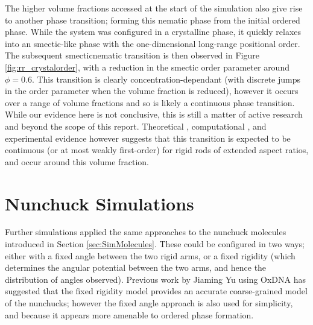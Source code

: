\documentclass[11pt, a4paper]{article} %
\begin{document}
The higher volume fractions accessed at the start of the simulation also give rise to another phase transition; forming this nematic phase from the initial ordered phase. While the system was configured in a crystalline phase, it quickly relaxes into an smectic-like phase with the one-dimensional long-range positional order. The subsequent smectic\textendash nematic transition is then observed in Figure \ref{fig:rr_crystalorder}, with a reduction in the smectic order parameter around $\phi  = 0.6$. This transition is clearly concentration-dependant (with discrete jumps in the order parameter when the volume fraction is reduced), however it occurs over a range of volume fractions and so is likely a continuous phase transition. While our evidence here is not conclusive, this is still a matter of active research and beyond the scope of this report. Theoretical \cite{Wen1987}, computational \cite{Frenkel1988, McGrother1996}, and experimental \cite{Dogic1997, Doane1972} evidence however suggests that this transition is expected to be continuous (or at most weakly first-order) for rigid rods of extended aspect ratios, and occur around this volume fraction. 

\section{Nunchuck Simulations} \label{sec:Nunchuck_Sim}
Further simulations applied the same approaches to the nunchuck molecules introduced in Section \ref{sec:SimMolecules}. These could be configured in two ways; either with a fixed angle between the two rigid arms, or a fixed rigidity (which determines the angular potential between the two arms, and hence the distribution of angles observed). Previous work by Jiaming Yu using OxDNA \cite{OxDNA} has suggested that the fixed rigidity model provides an accurate coarse-grained model of the nunchucks; however the fixed angle approach is also used for simplicity, and because it appears more amenable to ordered phase formation.


\end{document}
